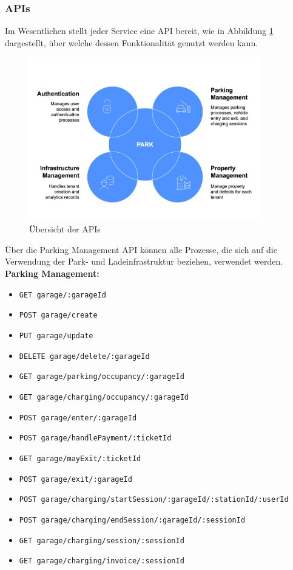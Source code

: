 \subsubsection{APIs}
Im Wesentlichen stellt jeder Service eine API bereit, wie in Abbildung \ref{fig:api-overview} dargestellt, über welche dessen Funktionalität genutzt werden kann.

\begin{figure}[H]
    \centering
    \includegraphics[width=0.9\textwidth]{resources/api-overview-blue.png}
    \caption{Übersicht der APIs}
    \label{fig:api-overview}
\end{figure}

Über die Parking Management API können alle Prozesse, die sich auf die Verwendung der Park- und Ladeinfrastruktur beziehen, verwendet werden. \\

\textbf{Parking Management:}
\begin{itemize}[noitemsep]
    \item[] \verb|GET garage/:garageId|
    \item[] \verb|POST garage/create|
    \item[] \verb|PUT garage/update|
    \item[] \verb|DELETE garage/delete/:garageId|
    \item[] \verb|GET garage/parking/occupancy/:garageId|
    \item[] \verb|GET garage/charging/occupancy/:garageId|
    \item[] \verb|POST garage/enter/:garageId|
    \item[] \verb|POST garage/handlePayment/:ticketId|
    \item[] \verb|GET garage/mayExit/:ticketId|
    \item[] \verb|POST garage/exit/:garageId|
    \item[] \verb|POST garage/charging/startSession/:garageId/:stationId/:userId|
    \item[] \verb|POST garage/charging/endSession/:garageId/:sessionId|
    \item[] \verb|GET garage/charging/session/:sessionId|
    \item[] \verb|GET garage/charging/invoice/:sessionId|
\end{itemize}


